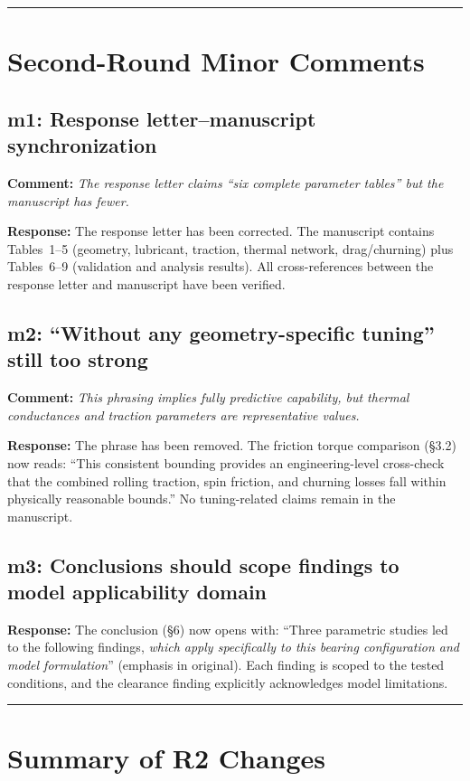 \documentclass[11pt]{article}
\newcommand{\reviewer}[1]{\subsection*{#1}}
\newcommand{\comment}[1]{\textbf{Comment:} \textit{#1}\par\medskip}
\newcommand{\response}[1]{\textbf{Response:} \textcolor{response}{#1}\par\bigskip}
\begin{document}
\bigskip
\noindent\rule{\textwidth}{0.4pt}

\section*{Second-Round Minor Comments}

\reviewer{m1: Response letter--manuscript synchronization}

\comment{The response letter claims ``six complete parameter tables'' but the manuscript has fewer.}

\response{The response letter has been corrected. The manuscript contains Tables~1--5 (geometry, lubricant, traction, thermal network, drag/churning) plus Tables~6--9 (validation and analysis results). All cross-references between the response letter and manuscript have been verified.}


\reviewer{m2: ``Without any geometry-specific tuning'' still too strong}

\comment{This phrasing implies fully predictive capability, but thermal conductances and traction parameters are representative values.}

\response{The phrase has been removed. The friction torque comparison (\S3.2) now reads: ``This consistent bounding provides an engineering-level cross-check that the combined rolling traction, spin friction, and churning losses fall within physically reasonable bounds.'' No tuning-related claims remain in the manuscript.}


\reviewer{m3: Conclusions should scope findings to model applicability domain}

\response{The conclusion (\S6) now opens with: ``Three parametric studies led to the following findings, \emph{which apply specifically to this bearing configuration and model formulation}'' (emphasis in original). Each finding is scoped to the tested conditions, and the clearance finding explicitly acknowledges model limitations.}


\bigskip
\noindent\rule{\textwidth}{0.4pt}

\section*{Summary of R2 Changes}
\end{document}
